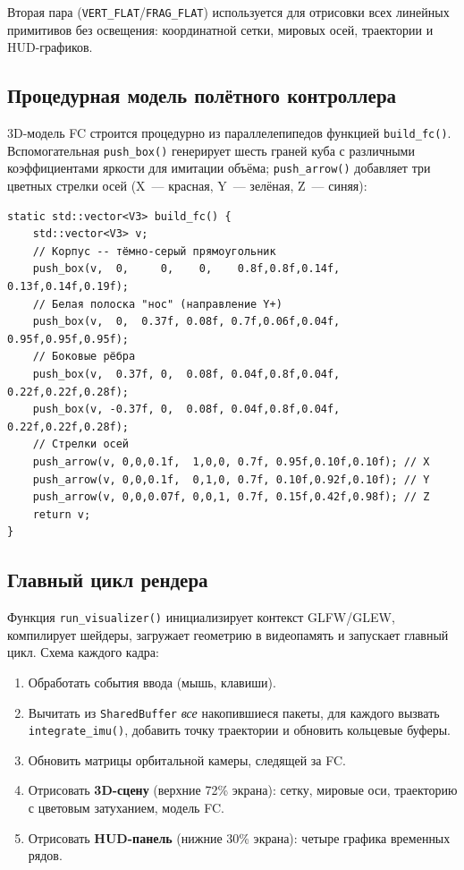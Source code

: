 Вторая пара (\texttt{VERT\_FLAT}/\texttt{FRAG\_FLAT}) используется для
отрисовки всех линейных примитивов без освещения: координатной сетки,
мировых осей, траектории и HUD-графиков.
 
\subsection{Процедурная модель полётного контроллера}
 
3D-модель FC строится процедурно из параллелепипедов функцией
\texttt{build\_fc()}. Вспомогательная \texttt{push\_box()} генерирует
шесть граней куба с различными коэффициентами яркости для имитации объёма;
\texttt{push\_arrow()} добавляет три цветных стрелки осей (X~--- красная,
Y~--- зелёная, Z~--- синяя):
 
\begin{lstlisting}[caption={Процедурная сборка модели FC}]
static std::vector<V3> build_fc() {
    std::vector<V3> v;
    // Корпус -- тёмно-серый прямоугольник
    push_box(v,  0,     0,    0,    0.8f,0.8f,0.14f, 0.13f,0.14f,0.19f);
    // Белая полоска "нос" (направление Y+)
    push_box(v,  0,  0.37f, 0.08f, 0.7f,0.06f,0.04f, 0.95f,0.95f,0.95f);
    // Боковые рёбра
    push_box(v,  0.37f, 0,  0.08f, 0.04f,0.8f,0.04f, 0.22f,0.22f,0.28f);
    push_box(v, -0.37f, 0,  0.08f, 0.04f,0.8f,0.04f, 0.22f,0.22f,0.28f);
    // Стрелки осей
    push_arrow(v, 0,0,0.1f,  1,0,0, 0.7f, 0.95f,0.10f,0.10f); // X
    push_arrow(v, 0,0,0.1f,  0,1,0, 0.7f, 0.10f,0.92f,0.10f); // Y
    push_arrow(v, 0,0,0.07f, 0,0,1, 0.7f, 0.15f,0.42f,0.98f); // Z
    return v;
}
\end{lstlisting}
 
\subsection{Главный цикл рендера}
 
Функция \texttt{run\_visualizer()} инициализирует контекст GLFW/GLEW,
компилирует шейдеры, загружает геометрию в видеопамять и запускает главный
цикл. Схема каждого кадра:
\begin{enumerate}[leftmargin=2cm]
    \item Обработать события ввода (мышь, клавиши).
    \item Вычитать из \texttt{SharedBuffer} \textit{все} накопившиеся
          пакеты, для каждого вызвать \texttt{integrate\_imu()}, добавить
          точку траектории и обновить кольцевые буферы.
    \item Обновить матрицы орбитальной камеры, следящей за FC.
    \item Отрисовать \textbf{3D-сцену} (верхние 72\% экрана):
          сетку, мировые оси, траекторию с цветовым затуханием, модель FC.
    \item Отрисовать \textbf{HUD-панель} (нижние 30\% экрана):
          четыре графика временных рядов.
\end{enumerate}
 
